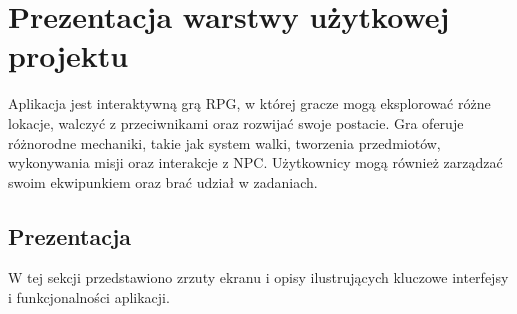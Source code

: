 ﻿%
\chapter{Prezentacja warstwy użytkowej projektu}

Aplikacja jest interaktywną grą RPG, w której gracze mogą eksplorować różne lokacje, 
walczyć z przeciwnikami oraz rozwijać swoje postacie. Gra oferuje różnorodne mechaniki, takie jak system walki, tworzenia przedmiotów, wykonywania misji oraz interakcje z NPC. 
Użytkownicy mogą również zarządzać swoim ekwipunkiem oraz brać udział w zadaniach.

\section{Prezentacja}
W tej sekcji przedstawiono zrzuty ekranu i opisy ilustrujących kluczowe interfejsy i funkcjonalności aplikacji.
